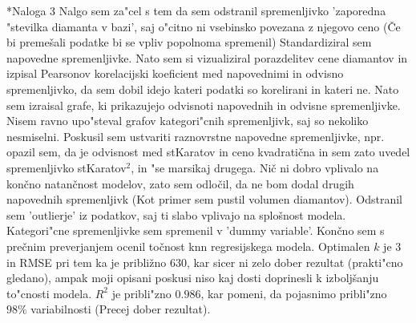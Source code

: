 \documentclass[a4paper, 10pt]{article}
\begin{document}
\begin{subsection}*{Naloga 3}
    Nalgo sem za"cel s tem da sem odstranil spremenljivko 'zaporedna "stevilka diamanta v bazi', saj 
    o"citno ni vsebinsko povezana z njegovo ceno (Če bi premešali podatke bi se vpliv popolnoma spremenil)
    Standardiziral sem napovedne spremenljivke. Nato sem si vizualiziral porazdelitev cene diamantov in izpisal 
    Pearsonov korelacijski koeficient med napovednimi in odvisno spremenljivko, da sem dobil idejo kateri podatki 
    so korelirani in kateri ne.
    Nato sem izraisal grafe, ki prikazujejo odvisnoti napovednih in odvisne spremenljivke. Nisem ravno upo"steval grafov kategori"cnih spremenljivk, saj so nekoliko nesmiselni. Poskusil sem ustvariti raznovrstne napovedne spremenljivke, npr. opazil
    sem, da je odvisnost med stKaratov in ceno kvadratična in sem zato uvedel spremenljivko stKaratov$^2$, in "se marsikaj drugega.
    Nič ni dobro vplivalo na končno natančnost modelov, zato sem odločil, da ne bom dodal drugih napovednih 
    spremenljivk (Kot primer sem pustil volumen diamantov).
    Odstranil sem 'outlierje' iz podatkov, saj ti slabo vplivajo na splošnost modela.
    Kategori"cne spremenljivke sem spremenil v 'dummy variable'. Končno sem s 
    prečnim preverjanjem ocenil točnost knn regresijskega modela.
    Optimalen $k$ je $3$ in RMSE pri tem ka je približno $630$, kar sicer ni zelo dober rezultat (prakti"cno gledano), ampak moji opisani poskusi
    niso kaj dosti doprinesli k izboljšanju to"cnosti modela. $R^2$ je pribli"zno $0.986$, kar pomeni, da pojasnimo pribli"zno $98\%$ variabilnosti (Precej dober rezultat).
\end{subsection}
\end{document}
